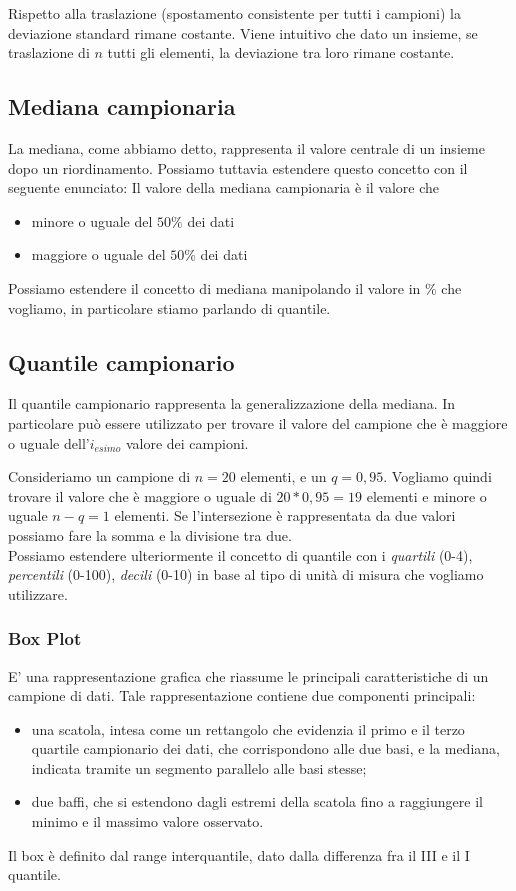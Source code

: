 Rispetto alla traslazione (spostamento consistente per tutti i campioni) la deviazione standard rimane costante. Viene intuitivo che dato un insieme, se traslazione di $n$ tutti gli elementi, la deviazione tra loro rimane costante.

\subsection{Mediana campionaria}
La mediana, come abbiamo detto, rappresenta il valore centrale di un insieme dopo un riordinamento. Possiamo tuttavia estendere questo concetto con il seguente enunciato:
Il valore della mediana campionaria è il valore che \begin{itemize}
\item minore o uguale del $50\%$ dei dati
\item maggiore o uguale del $50\%$ dei dati
\end{itemize}
Possiamo estendere il concetto di mediana manipolando il valore in \% che vogliamo, in particolare stiamo parlando di quantile. 
\subsection{Quantile campionario}
Il quantile campionario rappresenta la generalizzazione della mediana. In particolare può essere utilizzato per trovare il valore del campione che è maggiore o uguale dell'$i_{esimo}$ valore dei campioni. 

Consideriamo un campione di $n = 20$ elementi, e un $q = 0,95$. Vogliamo quindi trovare il valore che è maggiore o uguale di $20 * 0,95 = 19$ elementi e minore o uguale $n - q = 1$ elementi. Se l'intersezione è rappresentata da due valori possiamo fare la somma e la divisione tra due.\\

Possiamo estendere ulteriormente il concetto di quantile con i \emph{quartili} (0-4), \emph{percentili} (0-100), \emph{decili} (0-10) in base al tipo di unità di misura che vogliamo utilizzare.

\subsubsection{Box Plot} 
E' una rappresentazione grafica che riassume le principali caratteristiche di un campione di dati. Tale rappresentazione contiene due componenti principali:
\begin{itemize}
\item una scatola, intesa come un rettangolo che evidenzia il primo e il terzo quartile campionario dei dati, che corrispondono alle due basi, e la mediana, indicata tramite un segmento parallelo alle basi stesse;
\item due baﬀi, che si estendono dagli estremi della scatola fino a raggiungere il minimo e il massimo valore osservato.
\end{itemize}
Il box è definito dal range interquantile, dato dalla differenza fra il III e il I quantile.

